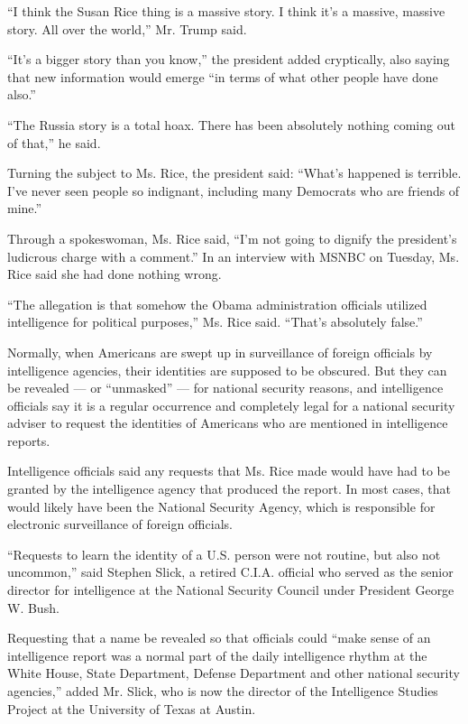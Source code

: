 ``I think the Susan Rice thing is a massive story. I think it's a
massive, massive story. All over the world,'' Mr. Trump said.

``It's a bigger story than you know,'' the president added cryptically,
also saying that new information would emerge ``in terms of what other
people have done also.''

``The Russia story is a total hoax. There has been absolutely nothing
coming out of that,'' he said.

Turning the subject to Ms. Rice, the president said: ``What's happened
is terrible. I've never seen people so indignant, including many
Democrats who are friends of mine.''

Through a spokeswoman, Ms. Rice said, ``I'm not going to dignify the
president's ludicrous charge with a comment.'' In an interview with
MSNBC on Tuesday, Ms. Rice said she had done nothing wrong.

``The allegation is that somehow the Obama administration officials
utilized intelligence for political purposes,'' Ms. Rice said. ``That's
absolutely false.''

Normally, when Americans are swept up in surveillance of foreign
officials by intelligence agencies, their identities are supposed to be
obscured. But they can be revealed --- or ``unmasked'' --- for national
security reasons, and intelligence officials say it is a regular
occurrence and completely legal for a national security adviser to
request the identities of Americans who are mentioned in intelligence
reports.

Intelligence officials said any requests that Ms. Rice made would have
had to be granted by the intelligence agency that produced the report.
In most cases, that would likely have been the National Security Agency,
which is responsible for electronic surveillance of foreign officials.

``Requests to learn the identity of a U.S. person were not routine, but
also not uncommon,'' said Stephen Slick, a retired C.I.A. official who
served as the senior director for intelligence at the National Security
Council under President George W. Bush.

Requesting that a name be revealed so that officials could ``make sense
of an intelligence report was a normal part of the daily intelligence
rhythm at the White House, State Department, Defense Department and
other national security agencies,'' added Mr. Slick, who is now the
director of the Intelligence Studies Project at the University of Texas
at Austin.

